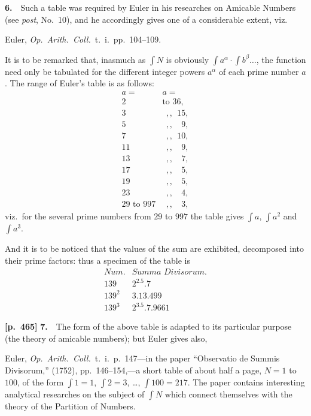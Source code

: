\documentclass[11pt,a4paper]{article}
\providecommand{\sumdiv}{{\textstyle\int}}
\begin{document}
\textbf{6.}\ \ Such a table was required by Euler in his researches on Amicable Numbers (see \textit{post}, No.~10), and he accordingly gives one of a considerable extent, viz.

Euler, \textit{Op.\ Arith.\ Coll.}\ t.~i.\ pp.~104--109.

It is to be remarked that, inasmuch as $\sumdiv N$ is obviously $\sumdiv a^\alpha\cdot\sumdiv b^\beta\ldots$, the function need only be tabulated for the different integer powers $a^\alpha$ of each prime number $a$.   The range of Euler's table is as follows:
\[
\begin{array}{rl}
a= & a= \\
2  & \text{to }36, \\
3  & \;\,,, \;\,15, \\
5  & \;\,,, \;\,\phantom{0}9, \\
7  & \;\,,, \;\,10, \\
11 & \;\,,, \;\,\phantom{0}9, \\
13 & \;\,,, \;\,\phantom{0}7, \\
17 & \;\,,, \;\,\phantom{0}5, \\
19 & \;\,,, \;\,\phantom{0}5, \\
23 & \;\,,, \;\,\phantom{0}4, \\
29\text{ to }997 & \;\,,, \;\,\phantom{0}3,
\end{array}
\]
viz.\ for the several prime numbers from $29$ to $997$ the table gives $\sumdiv a$, $\sumdiv a^2$ and $\sumdiv a^3$.

And it is to be noticed that the values of the sum are exhibited, decomposed into their prime factors: thus a specimen of the table is
\[
\begin{array}{c|c}
\textit{Num.} & \textit{Summa Divisorum.}\\\hline
139    & 2^2.5.7 \\
139^2  & 3.13.499 \\
139^3  & 2^3.5.7.9661
\end{array}
\]

\bigskip
\noindent\textbf{[p.~465]}\quad
\textbf{7.}\ \ The form of the above table is adapted to its particular purpose (the theory of amicable numbers); but Euler gives also,

Euler, \textit{Op.\ Arith.\ Coll.}\ t.~i.\ p.~147---in the paper ``Observatio de Summis Divisorum,'' (1752), pp.~146--154,---a short table of about half a page, $N=1$ to $100$, of the form $\sumdiv 1=1$, $\sumdiv 2=3$, \ldots, $\sumdiv 100=217$.   The paper contains interesting analytical researches on the subject of $\sumdiv N$ which connect themselves with the theory of the Partition of Numbers.
\end{document}
